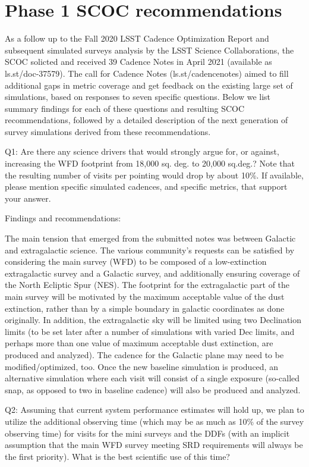 \section{Phase 1 SCOC recommendations}

As a follow up to the Fall 2020 LSST Cadence Optimization Report and subsequent simulated 
surveys analysis by the LSST Science Collaborations, the SCOC solicted and received 39 
Cadence Notes in April 2021 (available as ls.st/doc-37579). The call for Cadence Notes 
(ls.st/cadencenotes) aimed to fill additional gaps in metric coverage and get feedback on the 
existing large set of simulations, based on responses to seven specific questions. Below we 
list summary findings for each of these questions and resulting SCOC recommendations, 
followed by a detailed description of the next generation of survey simulations derived from 
these recommendations. 


Q1: Are there any science drivers that would strongly argue for, or against, increasing the WFD footprint from 18,000 sq. deg. to 20,000 sq.deg.? Note that the resulting number of visits per pointing would drop by about 10\%. If available, please mention specific simulated cadences, and specific metrics, that support your answer. 
 
Findings and recommendations:

The main tension that emerged from the submitted notes was between Galactic and 
extragalactic science. The various community’s requests can be satisfied by considering the main survey (WFD) to be composed of a low-extinction extragalactic survey and a Galactic survey, and additionally ensuring coverage of the North Ecliptic Spur (NES). The footprint for the extragalactic part of the main survey will be motivated by the maximum acceptable value of the dust extinction, rather than by a simple boundary in galactic coordinates as done originally. In addition, the extragalactic sky will be limited using two Declination limits (to be set later after a number of simulations with varied Dec limits, and perhaps more than one value of maximum acceptable dust extinction, are produced and analyzed). The cadence for the Galactic plane may need to be modified/optimized, too. Once the new baseline simulation is produced, an alternative simulation where each visit will consist of a single exposure (so-called snap, as opposed to two in baseline cadence) will also be produced and analyzed.


Q2: Assuming that current system performance estimates will hold up, we plan to utilize the additional observing time (which may be as much as 10\% of the survey observing time) for visits for the mini surveys and the DDFs (with an implicit assumption that the main WFD survey meeting SRD requirements will always be the first priority). What is the best scientific use of this time?   


